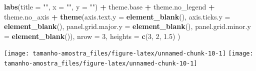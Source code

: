 \documentclass[
]{article}
\newenvironment{Shaded}{\begin{snugshade}}{\end{snugshade}}
\newcommand{\AttributeTok}[1]{\textcolor[rgb]{0.13,0.29,0.53}{#1}}
\newcommand{\DecValTok}[1]{\textcolor[rgb]{0.00,0.00,0.81}{#1}}
\newcommand{\FloatTok}[1]{\textcolor[rgb]{0.00,0.00,0.81}{#1}}
\newcommand{\FunctionTok}[1]{\textcolor[rgb]{0.13,0.29,0.53}{\textbf{#1}}}
\newcommand{\NormalTok}[1]{#1}
\newcommand{\OtherTok}[1]{\textcolor[rgb]{0.56,0.35,0.01}{#1}}
\newcommand{\SpecialCharTok}[1]{\textcolor[rgb]{0.81,0.36,0.00}{\textbf{#1}}}
\newcommand{\StringTok}[1]{\textcolor[rgb]{0.31,0.60,0.02}{#1}}
\begin{document}
\begin{Shaded}
\begin{Highlighting}[]
    \FunctionTok{labs}\NormalTok{(}\AttributeTok{title =} \StringTok{""}\NormalTok{,}
         \AttributeTok{x =} \StringTok{""}\NormalTok{,}
         \AttributeTok{y =} \StringTok{""}\NormalTok{) }\SpecialCharTok{+}
\NormalTok{    theme.base }\SpecialCharTok{+}\NormalTok{ theme.no\_legend }\SpecialCharTok{+}\NormalTok{ theme.no\_axis }\SpecialCharTok{+}
    \FunctionTok{theme}\NormalTok{(}\AttributeTok{axis.text.y =} \FunctionTok{element\_blank}\NormalTok{(),}
          \AttributeTok{axis.ticks.y =} \FunctionTok{element\_blank}\NormalTok{(),}
          \AttributeTok{panel.grid.major.y =} \FunctionTok{element\_blank}\NormalTok{(),}
          \AttributeTok{panel.grid.minor.y =} \FunctionTok{element\_blank}\NormalTok{()),}
  \AttributeTok{nrow =} \DecValTok{3}\NormalTok{,}
  \AttributeTok{heights =} \FunctionTok{c}\NormalTok{(}\DecValTok{3}\NormalTok{, }\DecValTok{2}\NormalTok{, }\FloatTok{1.5}\NormalTok{)}
\NormalTok{)}
\end{Highlighting}
\end{Shaded}

\begin{center}  { \texttt{[image: tamanho-amostra\_files/figure-latex/unnamed-chunk-10-1]} } { \texttt{[image: tamanho-amostra\_files/figure-latex/unnamed-chunk-10-1]} }  \end{center}

\begin{Shaded}
\end{Shaded}
\end{document}

